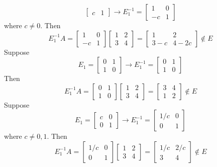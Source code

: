 \begin{description}
$$\begin{bmatrix}
c & 1
\end{bmatrix} \rightarrow E_1^{-1} = \begin{bmatrix}
1 & 0 \\
-c & 1
\end{bmatrix}$$
where $c \neq 0$. Then
$$E_1^{-1}A = \begin{bmatrix}
1 & 0 \\
-c & 1
\end{bmatrix}\begin{bmatrix}
1 & 2 \\
3 & 4
\end{bmatrix} = \begin{bmatrix}
1 & 2 \\
3 - c & 4 - 2c
\end{bmatrix} \not \in E$$
Suppose
$$E_1 = \begin{bmatrix}
0 & 1 \\
1 & 0
\end{bmatrix} \rightarrow E_1^{-1} = \begin{bmatrix}
0 & 1 \\
1 & 0
\end{bmatrix}$$
Then
$$E_1^{-1}A = \begin{bmatrix}
0 & 1 \\
1 & 0
\end{bmatrix}\begin{bmatrix}
1 & 2 \\
3 & 4
\end{bmatrix} = \begin{bmatrix}
3 & 4 \\
1 & 2
\end{bmatrix} \not \in E$$
Suppose
$$E_1 = \begin{bmatrix}
c & 0 \\
0 & 1
\end{bmatrix} \rightarrow E_1^{-1} = \begin{bmatrix}
1/c & 0 \\
0 & 1
\end{bmatrix}$$
where $c \neq 0, 1$. Then
$$E_1^{-1}A = \begin{bmatrix}
1/c & 0 \\
0 & 1
\end{bmatrix}\begin{bmatrix}
1 & 2 \\
3 & 4
\end{bmatrix} = \begin{bmatrix}
1/c & 2/c \\
3 & 4
\end{bmatrix} \not \in E$$

\end{description}
